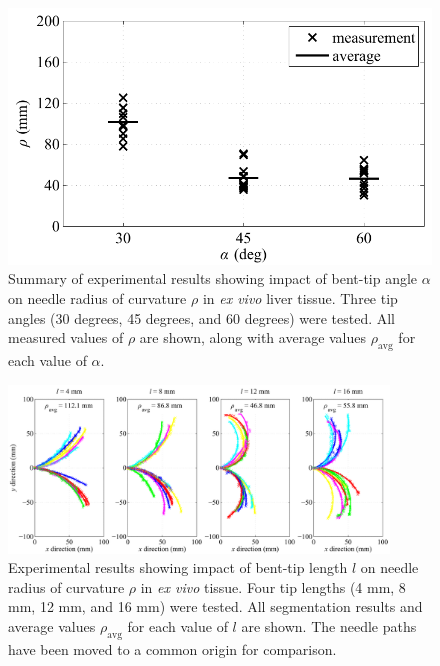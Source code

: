 \begin{figure}[!ht]
\centering
\includegraphics[width=0.75\columnwidth]{Images/Chapter3/CurvatureVsAngle/CurvatureVsAngle}%
\caption[Impact of bent-tip angle $\alpha$ on needle radius of curvature $\rho$]{Summary of experimental results showing impact of bent-tip angle $\alpha$ on needle radius of curvature $\rho$ in \textit{ex vivo} liver tissue. Three tip angles (30 degrees, 45 degrees, and 60 degrees) were tested. All measured values of $\rho$ are shown, along with average values $\rho_{\text{avg}}$ for each value of $\alpha$.}
\label{fig:CurvatureVsAngle}
\end{figure} 

\begin{figure}[!t]
\centering
\includegraphics[width=0.9\textwidth]{Images/Chapter3/CurvatureVsLength/CurvatureVsLengthData}%
\caption[Experimental results showing impact of bent-tip length $l$]{Experimental results showing impact of bent-tip length $l$ on needle radius of curvature $\rho$ in \textit{ex vivo} tissue. Four tip lengths (4 mm, 8 mm, 12 mm, and 16 mm) were tested. All segmentation results and average values $\rho_{\text{avg}}$ for each value of $l$ are shown. The needle paths have been moved to a common origin for comparison.}
\label{fig:CurvatureVsLengthData}
\end{figure}

